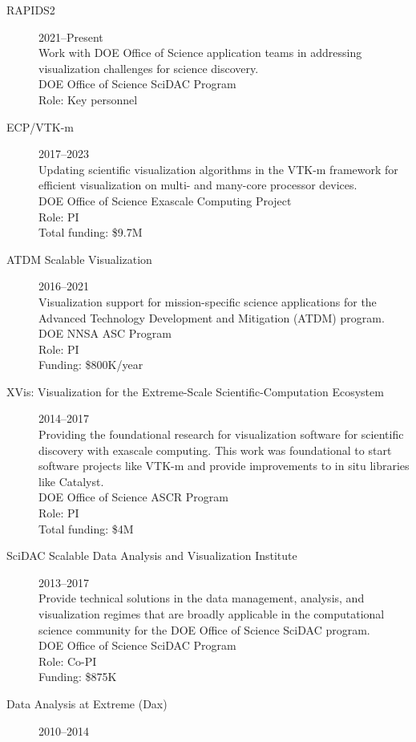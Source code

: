 \documentclass{article}
\begin{document}
\begin{description}
\item[RAPIDS2]\hfill 2021--Present\\
  Work with DOE Office of Science application teams in addressing visualization challenges for science discovery.\\
  DOE Office of Science SciDAC Program\\
  Role: Key personnel
\item[ECP/VTK-m]\hfill 2017--2023\\
  Updating scientific visualization algorithms in the VTK-m framework for efficient visualization on multi- and many-core processor devices.\\
  DOE Office of Science Exascale Computing Project\\
  Role: PI\\
  Total funding: \$9.7M %
\item[ATDM Scalable Visualization]\hfill 2016--2021\\
  Visualization support for mission-specific science applications for the Advanced Technology Development and Mitigation (ATDM) program.\\
  DOE NNSA ASC Program\\
  Role: PI\\
  Funding: \$800K/year
\item[XVis: Visualization for the Extreme-Scale Scientific-Computation Ecosystem]\hfill 2014--2017\\
  Providing the foundational research for visualization software for scientific discovery with exascale computing. This work was foundational to start software projects like \mbox{VTK-m} and provide improvements to in situ libraries like Catalyst. \\
  DOE Office of Science ASCR Program\\
  Role: PI \\
  Total funding: \$4M
\item[SciDAC Scalable Data Analysis and Visualization Institute]\hfill 2013--2017\\
  Provide technical solutions in the data management, analysis, and
  visualization regimes that are broadly applicable in the
  computational science community for the DOE Office of Science SciDAC program.\\
  DOE Office of Science SciDAC Program\\
  Role: Co-PI\\
  Funding: \$875K
\item[Data Analysis at Extreme (Dax)]\hfill 2010--2014\\

\end{description}
\end{document}
